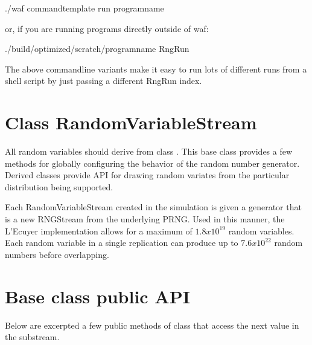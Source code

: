 \documentclass[letterpaper,10pt,english]{sphinxmanual}
\renewcommand{\sphinxcode}[1]{\texttt{\small{#1}}}
\begin{document}
\begin{sphinxVerbatim}[commandchars=\\\{\}]
\PYGZdl{} ./waf \PYGZhy{}\PYGZhy{}command\PYGZhy{}template \PYGZhy{}\PYGZhy{}run program\PYGZhy{}name
\end{sphinxVerbatim}

or, if you are running programs directly outside of waf:

\begin{sphinxVerbatim}[commandchars=\\\{\}]
\PYGZdl{} ./build/optimized/scratch/program\PYGZhy{}name \PYGZhy{}\PYGZhy{}RngRun
\end{sphinxVerbatim}

The above command\sphinxhyphen{}line variants make it easy to run lots of different
runs from a shell script by just passing a different RngRun index.


\section{Class RandomVariableStream}
\label{\detokenize{random-variables:class-randomvariablestream}}
All random variables should derive from class \sphinxcode{}. This
base class provides a few methods for globally configuring the behavior
of the random number generator. Derived classes provide API for drawing random
variates from the particular distribution being supported.

Each RandomVariableStream created in the simulation is given a generator that is a
new RNGStream from the underlying PRNG. Used in this manner, the L’Ecuyer
implementation allows for a maximum of \(1.8x10^19\) random variables.  Each
random variable in a single replication can produce up to \(7.6x10^22\)
random numbers before overlapping.


\section{Base class public API}
\label{\detokenize{random-variables:base-class-public-api}}
Below are excerpted a few public methods of class \sphinxcode{}
that access the next value in the substream.

\begin{sphinxVerbatim}[commandchars=\\\{\}]
   

   
\end{sphinxVerbatim}
\end{document}
